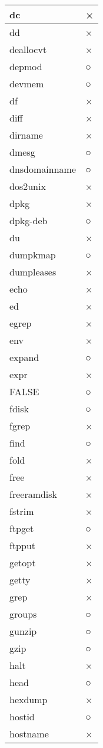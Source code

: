 \begin{longtable}{p{60mm}p{60mm}}
dc & × \\ \hline
dd & × \\ \hline
deallocvt & × \\ \hline
depmod & ○ \\ \hline
devmem & ○ \\ \hline
df & × \\ \hline
diff & × \\ \hline
dirname & × \\ \hline
dmesg & ○ \\ \hline
dnsdomainname & ○ \\ \hline
dos2unix & × \\ \hline
dpkg & × \\ \hline
dpkg-deb & ○ \\ \hline
du & × \\ \hline
dumpkmap & ○ \\ \hline
dumpleases & × \\ \hline
echo & × \\ \hline
ed & × \\ \hline
egrep & × \\ \hline
env & × \\ \hline
expand & ○ \\ \hline
expr & × \\ \hline
FALSE & ○ \\ \hline
fdisk & ○ \\ \hline
fgrep & × \\ \hline
find & ○ \\ \hline
fold & × \\ \hline
free & × \\ \hline
freeramdisk & × \\ \hline
fstrim & × \\ \hline
ftpget & ○ \\ \hline
ftpput & × \\ \hline
getopt & × \\ \hline
getty & × \\ \hline
grep & × \\ \hline
groups & ○ \\ \hline
gunzip & ○ \\ \hline
gzip & ○ \\ \hline
halt & × \\ \hline
head & ○ \\ \hline
hexdump & × \\ \hline
hostid & ○ \\ \hline
hostname & × \\ \hline

\end{longtable}
